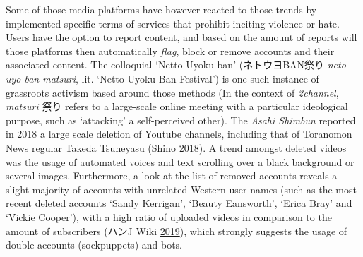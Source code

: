 \documentclass[10pt,british,A4paper,,openany]{memoir}
\begin{document}
Some of those media platforms have however reacted to those trends by
implemented specific terms of services that prohibit inciting violence
or hate. Users have the option to report content, and based on the
amount of reports will those platforms then automatically \emph{flag},
block or remove accounts and their associated content. The colloquial
`Netto-Uyoku ban' (ネトウヨBAN祭り \emph{neto-uyo ban matsuri}, lit.
`Netto-Uyoku Ban Festival') is one such instance of grassroots activism
based around those methods (In the context of \emph{2channel},
\emph{matsuri} 祭り refers to a large-scale online meeting with a
particular ideological purpose, such as `attacking' a self-perceived
other). The \emph{Asahi Shimbun} reported in 2018 a large scale deletion
of Youtube channels, including that of Toranomon News regular Takeda
Tsuneyasu (Shino \protect\hyperlink{ref-shino_eng:_2018}{2018}). A trend
amongst deleted videos was the usage of automated voices and text
scrolling over a black background or several images. Furthermore, a look
at the list of removed accounts reveals a slight majority of accounts
with unrelated Western user names (such as the most recent deleted
accounts `Sandy Kerrigan', `Beauty Eansworth', `Erica Bray' and `Vickie
Cooper'), with a high ratio of uploaded videos in comparison to the
amount of subscribers (ハンJ Wiki
\protect\hyperlink{ref-j_wiki_completed_2019}{2019}), which strongly
suggests the usage of double accounts (sockpuppets) and bots.
\end{document}

